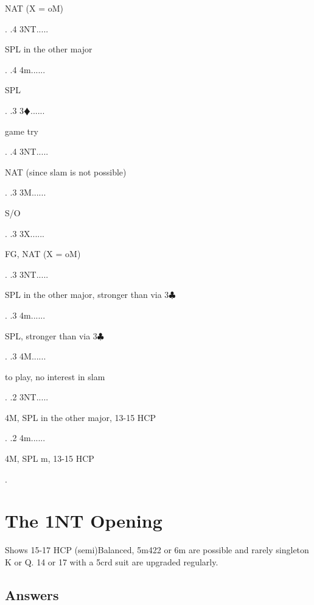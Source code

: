 \documentclass[a4paper]{article}
\newcommand{\BC}{\textcolor{OliveGreen}{$\clubsuit$}}
\newcommand{\BD}{\textcolor{RedOrange}{$\vardiamondsuit$}}
\begin{document}
{\begin{minipage}[t]{0.8\textwidth}
NAT (X = oM)
\end{minipage}. 
 .4 3NT.....\begin{minipage}[t]{0.8\textwidth}
SPL in the other major
\end{minipage}. 
 .4 4m......\begin{minipage}[t]{0.8\textwidth}
SPL
\end{minipage}. 
 .3 3\BD......\begin{minipage}[t]{0.8\textwidth}
game try
\end{minipage}. 
 .4 3NT.....\begin{minipage}[t]{0.8\textwidth}
NAT (since slam is not possible)
\end{minipage}. 
 .3 3M......\begin{minipage}[t]{0.8\textwidth}
S/O
\end{minipage}. 
 .3 3X......\begin{minipage}[t]{0.8\textwidth}
FG, NAT (X = oM)
\end{minipage}. 
 .3 3NT.....\begin{minipage}[t]{0.8\textwidth}
SPL in the other major, stronger than via 3\BC 
\end{minipage}. 
 .3 4m......\begin{minipage}[t]{0.8\textwidth}
SPL, stronger than via 3\BC 
\end{minipage}. 
 .3 4M......\begin{minipage}[t]{0.8\textwidth}
to play, no interest in slam
\end{minipage}. 
 .2 3NT.....\begin{minipage}[t]{0.8\textwidth}
4M, SPL in the other major, 13-15 HCP
\end{minipage}. 
 .2 4m......\begin{minipage}[t]{0.8\textwidth}
4M, SPL m, 13-15 HCP
\end{minipage}. 
}
\bigbreak
\section{The 1NT Opening}

Shows 15-17 HCP (semi)Balanced, 5m422 or 6m are possible and rarely singleton K or Q. 14 or 17 with a 5crd suit are upgraded regularly.
\bigbreak
\subsection{Answers}
\end{document}
